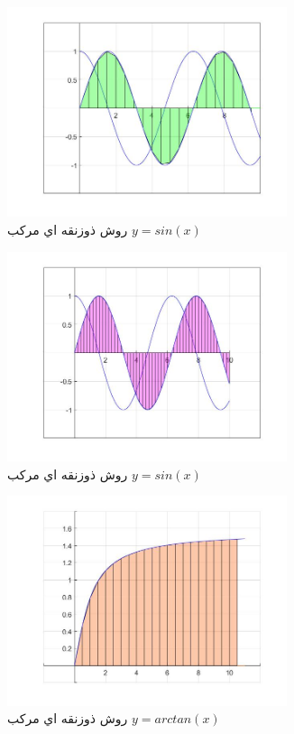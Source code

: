\documentclass{article}
\begin{document}
\begin{figure}[!h]
    \centering
\includegraphics[width=8.2cm]{pic29codeIntegral.jpg}
    \caption{ روش ذوزنقه اي مرکب $y=sin(x)$ }
    \label{fig:انتگرال خط}
\end{figure}

\begin{figure}[!h]
    \centering
\includegraphics[width=8.2cm]{pic31codeIntegral.jpg}
    \caption{ روش ذوزنقه اي مرکب $y=sin(x)$ }
    \label{fig:انتگرال خط}
\end{figure}

\begin{figure}[!h]
    \centering
\includegraphics[width=8.2cm]{pic45codeIntegral.jpg}
    \caption{ روش ذوزنقه اي مرکب $y=arctan(x)$ }
    \label{fig:انتگرال خط}
\end{figure}
\end{document}
